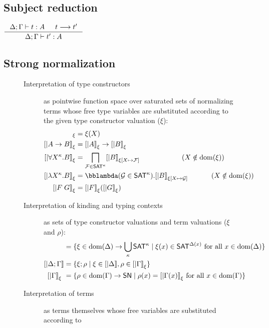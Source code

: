 \subsection*{Subject reduction}
\begin{theorem}
$\inference{\Delta;\Gamma |- t : A  & t --> t'}{\Delta;\Gamma |- t' : A}$
\end{theorem}


\subsection*{Strong normalization}
\begin{figure}
\begin{singlespace}
\begin{description}
\item[Interpretation of type constructors]
	as pointwise function space over saturated sets of normalizing terms
	whose free type variables are substituted according to
	the given type constructor valuation ($\xi$):
\begin{align*}
[| X |]_\xi      &= \xi(X) \\ 
[| A -> B |]_\xi &= [|A|]_\xi -> [|B|]_\xi \\
[| \forall X^\kappa . B |]_\xi
	&= \bigsqcap_{\mathcal{F}\in\SAT^\kappa} [|B|]_{\xi[X\mapsto\mathcal{F}]}
		\qquad\qquad\qquad (X\notin\dom(\xi)) \\
[| \l X^\kappa . B |]_\xi
	&= \bbl(\mathcal{G} \in \SAT^\kappa) . [|B|]_{\xi[X\mapsto\mathcal{G}]}
		\qquad\quad~ (X\notin\dom(\xi)) \\
[| F \; G |]_\xi &= [|F|]_\xi ( [|G|]_\xi )
\end{align*}
\item[Interpretation of kinding and typing contexts]
	as sets of type constructor valuations and term valuations
	($\xi$ and $\rho$):
\begin{align*}
[| \Delta        |] &= \{ \xi \in \dom(\Delta) -> \bigcup_{\kappa} \SAT^\kappa \mid \xi(x)\in\SAT^{\Delta(x)} ~\text{for all}~x\in\dom(\Delta) \} \\
[| \Delta;\Gamma |] &= \{ \xi;\rho \mid \xi\in[|\Delta|], \rho\in[|\Gamma|]_\xi \} \\
[| \Gamma        |]_\xi\ &= \{ \rho \in \dom(\Gamma) -> \SN \mid \rho(x)=[|\Gamma(x)|]_\xi ~\text{for all}~x\in\dom(\Gamma) \}
\end{align*}
\item[Interpretation of terms]
	as terms themselves whose free variables are substituted according to

\end{description}
\end{singlespace}
\end{figure}
